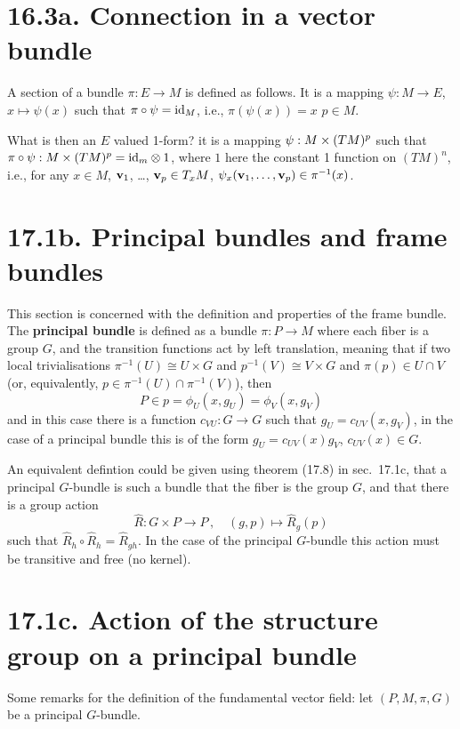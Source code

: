 \documentclass[a4paper,12pt]{article}
\begin{document}
\section*{16.3a. Connection in a vector bundle}

A section of a bundle $\pi:E\to M$ is defined as follows. It is a mapping $\psi : M \to E$, $x \mapsto \psi(x)$ such that $\pi\circ\psi = {\rm id}_M$, i.e., $\pi(\psi(x)) = x$ $p\in M$.

What is then an $E$ valued 1-form? it is a mapping
${\bf \psi}: M \times (TM)^p$ such that $\pi \circ {\bf \psi} : M \times (TM)^p = {\rm id}_m \otimes 1$, where $1$ here the constant 1 function on $(TM)^n$, i.e., for any $x\in M$, ${\bf v}_1$, \dots, ${\bf v}_p\in T_x M$, $\psi_x({\bf v}_1, \dots, {\bf v}_p)\in \pi^{-1}(x)$.


\section*{17.1b. Principal bundles and frame bundles}
This section is concerned with the definition and properties of the frame bundle. The {\bf principal bundle} is defined as a bundle $\pi : P\to M$ where each fiber is a group $G$, and the transition functions act by left translation, meaning that if
two local trivialisations $\pi^{-1}(U)\cong U\times G$ and $p^{-1}(V)\cong V\times G$ and $\pi(p)\in U\cap V$ (or, equivalently, $p\in \pi^{-1}(U)\cap \pi^{-1}(V)$), then
\[
 P \in p = \phi_U(x, g_U) = \phi_V(x, g_V)
\]
and in this case there is a function $c_{VU}: G\to G$ such that $g_U = c_{UV}(x, g_V)$, in the case of a principal bundle this is of the form $g_U = c_{UV}(x) g_V$, $c_{UV}(x)\in G$.

An equivalent defintion could be given using theorem (17.8) in sec.\ 17.1c, that a principal $G$-bundle is such a bundle that the fiber is the group $G$, and that there is a group action
\[
 \hat{R}: G \times P \to P\,,\quad (g, p) \mapsto \hat{R}_g(p)
\]
such that $\hat{R}_h\circ \hat{R}_h = \hat{R}_{gh}$. In the case of the principal $G$-bundle this action must be transitive and free (no kernel).





\section*{17.1c. Action of the structure group on a principal bundle}

Some remarks for the definition of the fundamental vector field: let $(P, M, \pi, G)$ be a principal $G$-bundle.
\end{document}
